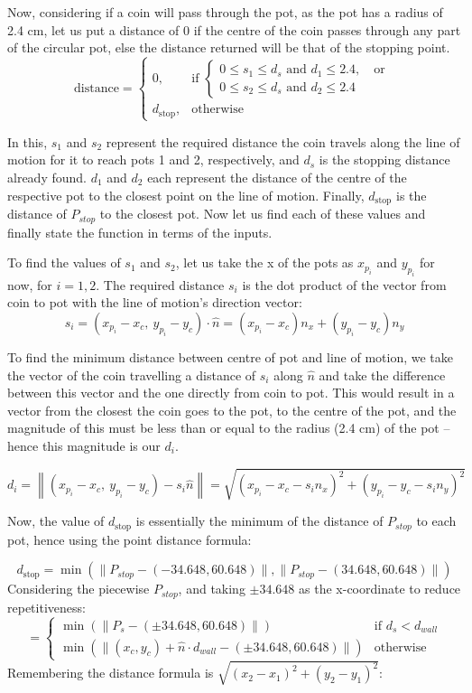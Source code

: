 \documentclass[10pt]{article}
\begin{document}
Now, considering if a coin will pass through the pot, as the pot has a radius of 2.4 cm, let us put a distance of 0 if the centre of the coin passes through any part of the circular pot, else the distance returned will be that of the stopping point.
\[
\text{distance} =
\begin{cases}
0, & \text{if } 
\begin{cases}
0 \leq s_1 \leq d_{s} \text{ and } d_1 \leq 2.4, \quad \text{or} \\
0 \leq s_2 \leq d_{s} \text{ and } d_2 \leq 2.4
\end{cases} \\
d_{\text{stop}}, & \text{otherwise}
\end{cases}
\]

In this, $s_1$ and $s_2$ represent the required distance the coin travels along the line of motion for it to reach pots 1 and 2, respectively, and $d_s$ is the stopping distance already found. $d_1$ and $d_2$ each represent the distance of the centre of the respective pot to the closest point on the line of motion. Finally, $d_{\text{stop}}$ is the distance of $P_{stop}$ to the closest pot. Now let us find each of these values and finally state the function in terms of the inputs.

To find the values of $s_1$ and $s_2$, let us take the x of the pots as $x_{p_i}$ and $y_{p_i}$ for now, for $i = 1,2$. The required distance $s_i$ is the dot product of the vector from coin to pot with the line of motion's direction vector:
\[
s_i = (x_{p_i} - x_c,\ y_{p_i} - y_c) \cdot \hat{n} = (x_{p_i} - x_c)n_x + (y_{p_i} - y_c)n_y
\]

To find the minimum distance between centre of pot and line of motion, we take the vector of the coin travelling a distance of $s_i$ along $\hat{n}$ and take the difference between this vector and the one directly from coin to pot. This would result in a vector from the closest the coin goes to the pot, to the centre of the pot, and the magnitude of this must be less than or equal to the radius (2.4 cm) of the pot -- hence this magnitude is our $d_i$.

\[
d_i = \left\| (x_{p_i} - x_c,\ y_{p_i} - y_c) - s_i \hat{n} \right\| = 
\sqrt{(x_{p_i} - x_c - s_i n_x)^2 + (y_{p_i} - y_c - s_i n_y)^2}
\]

Now, the value of $d_{\text{stop}}$ is essentially the minimum of the distance of $P_{stop}$ to each pot, hence using the point distance formula:

\[
d_{\text{stop}} = \min\left(\|P_{stop} - (-34.648, 60.648)\|,\|P_{stop} - (34.648, 60.648)\|\right)
\]
Considering the piecewise $P_{stop}$, and taking $\pm34.648$ as the x-coordinate to reduce repetitiveness:
\[
=
\begin{cases}
\min\left(\|P_{s} - (\pm34.648, 60.648)\|\right) & \text{if } d_s < d_{wall} \\
\min\left(\|(x_c,y_c) + \hat{n} \cdot d_{wall} - (\pm34.648, 60.648)\|\right) & \text{otherwise}
\end{cases}
\]
Remembering the distance formula is $\sqrt{(x_2 - x_1)^2 + (y_2 - y_1)^2}$:
\end{document}
